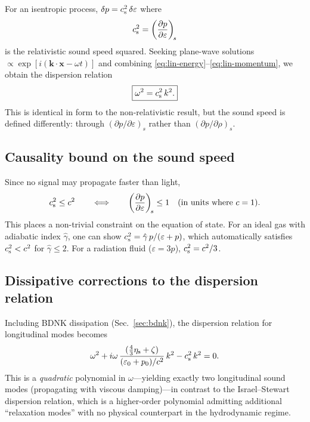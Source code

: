 For an isentropic process, $\delta p = c_{\mathrm{s}}^2\,\delta\varepsilon$
where
\begin{equation}
  c_{\mathrm{s}}^2 = \left(\frac{\partial p}{\partial\varepsilon}\right)_{\!s}
  \label{eq:sound-speed-def}
\end{equation}
is the relativistic sound speed squared.  Seeking plane-wave
solutions $\propto \exp[i(\mathbf{k}\cdot\mathbf{x} - \omega t)]$
and combining \eqref{eq:lin-energy}--\eqref{eq:lin-momentum},
we obtain the dispersion relation
\begin{equation}
  \boxed{\omega^2 = c_{\mathrm{s}}^2\, k^2.}
  \label{eq:rel-dispersion}
\end{equation}
This is identical in form to the non-relativistic result, but the
sound speed is defined differently: through
$(\partial p/\partial\varepsilon)_s$ rather than
$(\partial p/\partial\rho)_s$.

\subsection{Causality bound on the sound speed}
\label{sec:causality-bound}

Since no signal may propagate faster than light,
\begin{equation}
  c_{\mathrm{s}}^2 \le c^2
  \qquad\Longleftrightarrow\qquad
  \left(\frac{\partial p}{\partial\varepsilon}\right)_{\!s} \le 1
  \quad\text{(in units where $c = 1$)}.
  \label{eq:causality-cs}
\end{equation}
This places a non-trivial constraint on the equation of state.  For
an ideal gas with adiabatic index $\hat{\gamma}$, one can show
$c_{\mathrm{s}}^2 = \hat{\gamma}\,p/(\varepsilon + p)$, which automatically
satisfies $c_{\mathrm{s}}^2 < c^2$ for $\hat{\gamma} \le 2$.  For a radiation
fluid ($\varepsilon = 3p$), $c_{\mathrm{s}}^2 = c^2/3$.

\subsection{Dissipative corrections to the dispersion relation}
\label{sec:diss-dispersion}

Including BDNK dissipation (Sec.~\ref{sec:bdnk}), the dispersion
relation for longitudinal modes becomes
\begin{equation}
  \omega^2
  + i\omega\,\frac{(\tfrac{4}{3}\shearvisc + \bulkvisc)}%
    {(\varepsilon_0 + p_0)/c^2}\,k^2
  - \cs^2\, k^2 = 0.
  \label{eq:bdnk-dispersion}
\end{equation}
This is a \emph{quadratic} polynomial in $\omega$---yielding exactly
two longitudinal sound modes (propagating with viscous damping)---in
contrast to the Israel--Stewart dispersion relation, which is a
higher-order polynomial admitting additional ``relaxation modes''
with no physical counterpart in the hydrodynamic regime.

